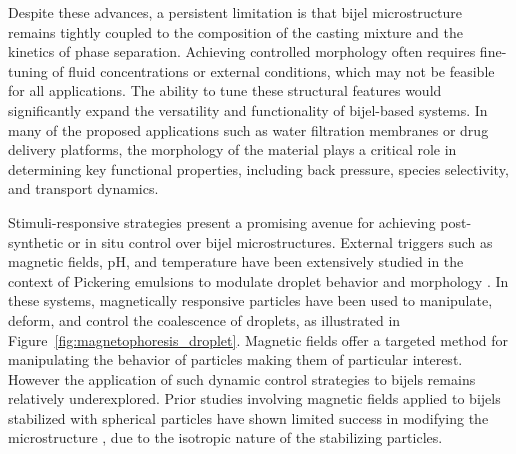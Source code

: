 
Despite these advances, a persistent limitation is that bijel microstructure remains tightly coupled to the composition of the casting mixture and the kinetics of phase separation. Achieving controlled 
morphology often requires fine-tuning of fluid concentrations or external conditions, which may not be feasible for all applications. \cite{haase_continuous_2015, reeves_particle-size_2015}
The ability to tune these structural features would significantly expand the versatility and functionality of bijel-based systems.
In many of the proposed applications such as water filtration membranes or drug delivery 
platforms, the morphology of the material plays a critical role in determining key functional properties, including back pressure, species selectivity, and transport dynamics.
\cite{vanoli_bijels_2022, thorson_bijel-templated_2019, khan_nanostructured_2022}

Stimuli-responsive strategies present a promising avenue for achieving post-synthetic or in situ control over bijel microstructures. External triggers such as magnetic fields, pH, and temperature have 
been extensively studied in the context of Pickering emulsions to modulate droplet behavior and morphology \cite{tham_magnetophoresis_2021, cui_stabilizing_2013}. In these systems, magnetically 
responsive particles have been used to manipulate, deform, and control the coalescence of droplets, as illustrated in Figure~\ref{fig:magnetophoresis_droplet}. Magnetic 
fields offer a targeted method for manipulating the behavior of particles making them of particular interest. 
However the application of such dynamic control strategies to bijels remains relatively underexplored. Prior studies involving magnetic fields applied to bijels stabilized with spherical particles 
have shown limited success in modifying the microstructure \cite{kim_bijels_2010}, due to the isotropic nature of the stabilizing particles. 

